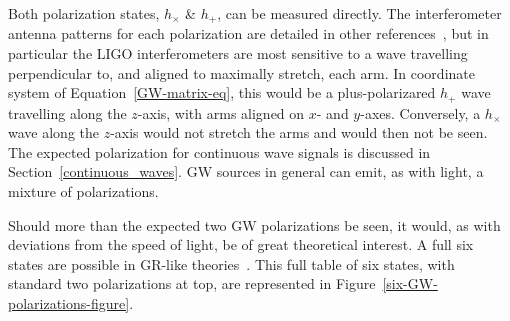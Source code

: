 Both polarization states, $h_\times$ \& $h_+$, can be measured directly.
The interferometer antenna patterns for each polarization are detailed in other references~\cite{GoetzThesis}, but in particular the LIGO interferometers are most sensitive to a wave travelling perpendicular to, and aligned to maximally stretch, each arm.
In coordinate system of Equation~\ref{GW-matrix-eq}, this would be a plus-polarizared $h_+$ wave travelling along the $z$-axis, with arms aligned on $x$- and $y$-axes.
Conversely, a $h_\times$ wave along the $z$-axis would not stretch the arms and would then not be seen.
The expected polarization for continuous wave signals is discussed in Section~\ref{continuous_waves}.
GW sources in general can emit, as with light, a mixture of polarizations.

Should more than the expected two GW polarizations be seen, it would, as with deviations from the speed of light, be of great theoretical interest.
A full six states are possible in GR-like theories~\cite{Will1993,Will2001}.
This full table of six states, with standard two polarizations at top, are represented in Figure~\ref{six-GW-polarizations-figure}.

